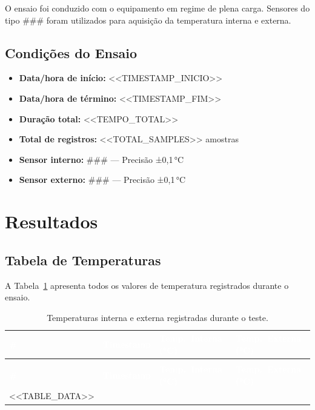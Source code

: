 \documentclass[12pt, a4paper]{article}
\begin{document}
O ensaio foi conduzido com o equipamento em regime de plena carga. Sensores do tipo ### foram utilizados para aquisição da temperatura interna e externa.

\subsection{Condições do Ensaio}

\begin{itemize}
  \item \textbf{Data/hora de início:} <<TIMESTAMP_INICIO>>
  \item \textbf{Data/hora de término:} <<TIMESTAMP_FIM>>
  \item \textbf{Duração total:} <<TEMPO_TOTAL>>
  \item \textbf{Total de registros:} <<TOTAL_SAMPLES>> amostras
  \item \textbf{Sensor interno:} ### --- Precisão ±0{,}1\,°C
  \item \textbf{Sensor externo:} ### --- Precisão ±0{,}1\,°C
\end{itemize}

\section{Resultados}

\subsection{Tabela de Temperaturas}

A Tabela~\ref{tab:temperaturas} apresenta todos os valores de temperatura registrados durante o ensaio.

\begin{longtable}{%
  >{\centering\arraybackslash}m{1.2cm}
  >{\centering\arraybackslash}m{5.2cm}
  >{\centering\arraybackslash}m{3.5cm}
  >{\centering\arraybackslash}m{3.5cm}
}
\caption{Temperaturas interna e externa registradas durante o teste.}
\label{tab:temperaturas}\\
\toprule
\rowcolor{azulescuro}
\textcolor{white}{\textbf{\#}} &
\textcolor{white}{\textbf{Timestamp}} &
\textcolor{white}{\textbf{Temp.\ Interna (°C)}} &
\textcolor{white}{\textbf{Temp.\ Externa (°C)}} \\
\midrule
\endfirsthead

\multicolumn{4}{c}{\footnotesize\itshape (continuação da Tabela~\ref{tab:temperaturas})}\\
\toprule
\rowcolor{azulescuro}
\textcolor{white}{\textbf{\#}} &
\textcolor{white}{\textbf{Timestamp}} &
\textcolor{white}{\textbf{Temp.\ Interna (°C)}} &
\textcolor{white}{\textbf{Temp.\ Externa (°C)}} \\
\midrule
\endhead

\bottomrule
\endfoot

\bottomrule
\endlastfoot

<<TABLE_DATA>>

\end{longtable}
\end{document}
